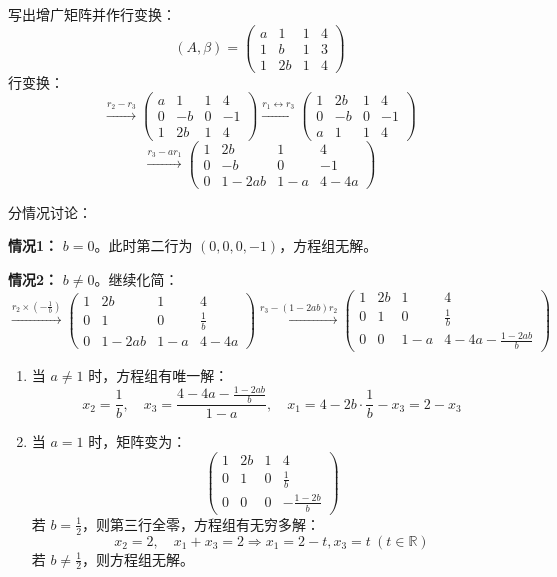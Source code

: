 \documentclass[lang=cn,12pt]{elegantbook}
\begin{document}
\begin{solution}
写出增广矩阵并作行变换：
\[
(A, \beta) = \begin{pmatrix}
a & 1 & 1 & 4 \\
1 & b & 1 & 3 \\
1 & 2b & 1 & 4
\end{pmatrix}
\]
行变换：
\[
\xrightarrow{r_2 - r_3} \begin{pmatrix}
a & 1 & 1 & 4 \\
0 & -b & 0 & -1 \\
1 & 2b & 1 & 4
\end{pmatrix}
\xrightarrow{r_1 \leftrightarrow r_3} \begin{pmatrix}
1 & 2b & 1 & 4 \\
0 & -b & 0 & -1 \\
a & 1 & 1 & 4
\end{pmatrix}
\]
\[
\xrightarrow{r_3 - a r_1} \begin{pmatrix}
1 & 2b & 1 & 4 \\
0 & -b & 0 & -1 \\
0 & 1-2ab & 1-a & 4-4a
\end{pmatrix}
\]

分情况讨论：

\textbf{情况1：} $b = 0$。此时第二行为 $(0, 0, 0, -1)$，方程组无解。

\textbf{情况2：} $b \neq 0$。继续化简：
\[
\xrightarrow{r_2 \times (-\frac{1}{b})} \begin{pmatrix}
1 & 2b & 1 & 4 \\
0 & 1 & 0 & \frac{1}{b} \\
0 & 1-2ab & 1-a & 4-4a
\end{pmatrix}
\xrightarrow{r_3 - (1-2ab)r_2} \begin{pmatrix}
1 & 2b & 1 & 4 \\
0 & 1 & 0 & \frac{1}{b} \\
0 & 0 & 1-a & 4-4a - \frac{1-2ab}{b}
\end{pmatrix}
\]

\begin{enumerate}
    \item 当 $a \neq 1$ 时，方程组有唯一解：
    \[
    x_2 = \frac{1}{b}, \quad x_3 = \frac{4-4a - \frac{1-2ab}{b}}{1-a}, \quad x_1 = 4 - 2b \cdot \frac{1}{b} - x_3 = 2 - x_3
    \]
    
    \item 当 $a = 1$ 时，矩阵变为：
    \[
    \begin{pmatrix}
    1 & 2b & 1 & 4 \\
    0 & 1 & 0 & \frac{1}{b} \\
    0 & 0 & 0 & -\frac{1-2b}{b}
    \end{pmatrix}
    \]
    若 $b = \frac{1}{2}$，则第三行全零，方程组有无穷多解：
    \[
    x_2 = 2, \quad x_1 + x_3 = 2 \Rightarrow x_1 = 2 - t, x_3 = t \ (t \in \mathbb{R})
    \]
    若 $b \neq \frac{1}{2}$，则方程组无解。
\end{enumerate}


\end{solution}
\end{document}
